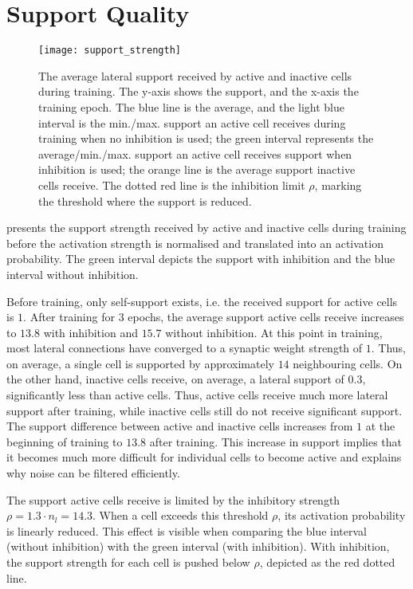 \section{Support Quality}
%
\begin{figure}[h]
    \centering
    \texttt{[image: support\_strength]}
    \caption[Average lateral support]{The average lateral support received by active and inactive cells during training. The y-axis shows the support, and the x-axis the training epoch. The blue line is the average, and the light blue interval is the min./max. support an active cell receives during training when no inhibition is used; the green interval represents the average/min./max. support an active cell receives support when inhibition is used; the orange line is the average support inactive cells receive. The dotted red line is the inhibition limit $\rho$, marking the threshold where the support is reduced.}
\end{figure}
%
 presents the support strength received by active and inactive cells during training before the activation strength is normalised and translated into an activation probability.
The green interval depicts the support with inhibition and the blue interval without inhibition.

Before training, only self-support exists, i.e. the received support for active cells is $1$.
After training for $3$ epochs, the average support active cells receive increases to $13.8$ with inhibition and $15.7$ without inhibition.
At this point in training, most lateral connections have converged to a synaptic weight strength of $1$.
Thus, on average, a single cell is supported by approximately $14$ neighbouring cells.
On the other hand, inactive cells receive, on average, a lateral support of $0.3$, significantly less than active cells.
Thus, active cells receive much more lateral support after training, while inactive cells still do not receive significant support.
The support difference between active and inactive cells increases from $1$ at the beginning of training to $13.8$ after training.
This increase in support implies that it becomes much more difficult for individual cells to become active and explains why noise can be filtered efficiently.

The support active cells receive is limited by the inhibitory strength $\rho = 1.3\cdot n_l = 14.3$.
When a cell exceeds this threshold $\rho$, its activation probability is linearly reduced.
This effect is visible when comparing the blue interval (without inhibition) with the green interval (with inhibition). With inhibition, the support strength for each cell is pushed below $\rho$, depicted as the red dotted line.

